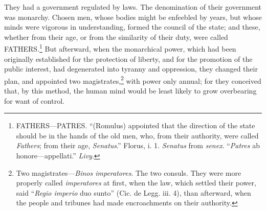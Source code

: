 They had a government regulated by laws. The denomination of their
government was monarchy. Chosen men, whose bodies might be enfeebled
by years, but whose minds were vigorous in understanding, formed the
council of the state; and these, whether from their age, or from the
similarity of their duty, were called FATHERS.\footnote{FATHERS—PATRES. ``(Romulus) appointed that the direction of
the state should be in the hands of the old men, who, from their
authority, were called \emph{Fathers}; from their age, \emph{Senatus}.'' Florus,
i. 1. \emph{Senatus} from \emph{senex}. ``\emph{Patres} ab honore—appellati.''
\emph{Livy}.} But afterward, when
the monarchical power, which had been originally established for the
protection of liberty, and for the promotion of the public interest,
had degenerated into tyranny and oppression, they changed their plan,
and appointed two magistrates,\footnote{Two magistrates—\emph{Binos imperatores}. The two consuls. They
were more properly called \emph{imperatores} at first, when the law, which
settled their power, said ``\emph{Regio imperio} duo sunto'' (Cic. de Legg.
iii. 4), than afterward, when the people and tribunes had made
encroachments on their authority.} with power only annual; for they
conceived that, by this method, the human mind would be least likely
to grow overbearing for want of control.

